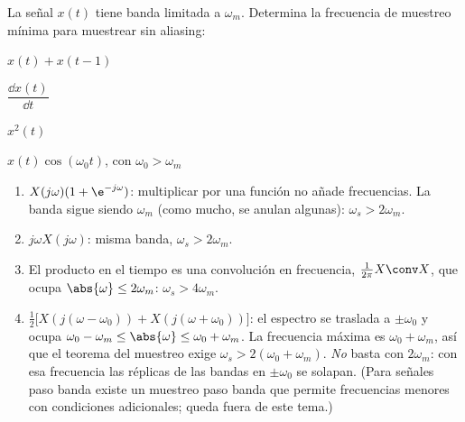 \documentclass[11pt,a4paper]{scrartcl}
\begin{document}
\begin{ejercicio}
  La señal $x(t)$ tiene banda limitada a $\omega_m$. Determina la frecuencia de muestreo mínima para muestrear sin aliasing:
  \begin{incisos}[2]
    \item $x(t)+x(t-1)$
    \item $\dfrac{\dd x(t)}{\dd t}$
    \item $x^2(t)$
    \item $x(t)\cos(\omega_0t)$, con $\omega_0>\omega_m$
  \end{incisos}
\end{ejercicio}
\begin{solucion}
  \begin{enumerate}[label=\alph*)]
    \item $X(j\omega)(1+\e^{-j\omega})$: multiplicar por una función no añade frecuencias. La banda sigue siendo $\omega_m$ (como mucho, se anulan algunas): $\omega_s>2\omega_m$.
    \item $j\omega X(j\omega)$: misma banda, $\omega_s>2\omega_m$.
    \item El producto en el tiempo es una convolución en frecuencia, $\frac{1}{2\pi}X\conv X$, que ocupa $\abs{\omega}\le2\omega_m$: $\omega_s>4\omega_m$.
    \item $\frac12\big[X(j(\omega-\omega_0))+X(j(\omega+\omega_0))\big]$: el espectro se traslada a $\pm\omega_0$ y ocupa $\omega_0-\omega_m\le\abs{\omega}\le\omega_0+\omega_m$. La frecuencia máxima es $\omega_0+\omega_m$, así que el teorema del muestreo exige $\omega_s>2(\omega_0+\omega_m)$. \emph{No} basta con $2\omega_m$: con esa frecuencia las réplicas de las bandas en $\pm\omega_0$ se solapan. (Para señales paso banda existe un muestreo paso banda que permite frecuencias menores con condiciones adicionales; queda fuera de este tema.)
  \end{enumerate}
\end{solucion}
\end{document}
